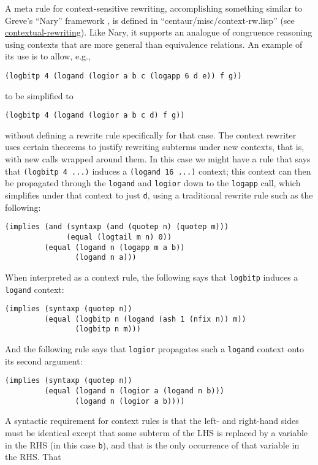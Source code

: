 A meta rule for context-sensitive rewriting, accomplishing something
similar to Greve's ``Nary'' framework \cite{greve06}, is defined in
``centaur/misc/context-rw.lisp'' (see
\href{http://www.cs.utexas.edu/users/moore/acl2/manuals/current/manual/index.html?topic=ACL2\_\_\_\_CONTEXTUAL-REWRITING}{\underline{contextual-rewriting}}).
Like Nary, it supports an analogue of congruence reasoning using
contexts that are more general than equivalence relations.  An example
of its use is to allow, e.g.,
\begin{verbatim}
(logbitp 4 (logand (logior a b c (logapp 6 d e)) f g))
\end{verbatim}
\noindent to be simplified to
\begin{verbatim}
(logbitp 4 (logand (logior a b c d) f g))
\end{verbatim}
without defining a rewrite rule specifically for that case. The
context rewriter uses certain theorems to justify rewriting subterms
under new contexts, that is, with new calls wrapped around them.  In
this case we might have a rule that says that \texttt{(logbitp 4 ...)}
induces a \texttt{(logand 16 ...)} context; this context can then be
propagated through the \texttt{logand} and \texttt{logior} down to the
\texttt{logapp} call, which simplifies under that context to just
\texttt{d}, using a traditional rewrite rule such as the following:
\begin{verbatim}
(implies (and (syntaxp (and (quotep n) (quotep m)))
              (equal (logtail m n) 0))
         (equal (logand n (logapp m a b))
                (logand n a)))
\end{verbatim}
\noindent When interpreted as a context rule, the following says that
\texttt{logbitp} induces a \texttt{logand} context:
\begin{verbatim}
(implies (syntaxp (quotep n))
         (equal (logbitp n (logand (ash 1 (nfix n)) m))
                (logbitp n m)))
\end{verbatim}
\noindent And the following rule says that \texttt{logior} propagates such a
\texttt{logand} context onto its second argument:
\begin{verbatim}
(implies (syntaxp (quotep n))
         (equal (logand n (logior a (logand n b)))
                (logand n (logior a b))))
\end{verbatim}
\noindent A syntactic requirement for context rules is that the left-
and right-hand sides must be identical except that some subterm of the
LHS is replaced by a variable in the RHS (in this case \texttt{b}),
and that is the only occurrence of that variable in the RHS.  That
